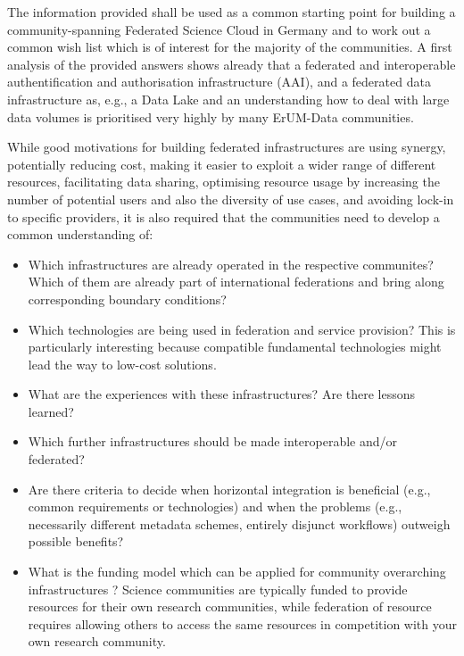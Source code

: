 \documentclass{article}
\begin{document}
The information provided shall be used as a common starting point for building
a community-spanning Federated Science Cloud in Germany and to work out
a common wish list which is of interest for the majority of the communities.
A first analysis of the provided answers shows already that
a federated and interoperable authentification and authorisation infrastructure (AAI),
and a federated data infrastructure as, e.g., a Data Lake and an understanding how to 
deal with large data volumes is prioritised very highly by many ErUM-Data communities.

While good motivations for building federated infrastructures are
using synergy, potentially reducing cost, making it easier to exploit a wider range of
different resources, facilitating data sharing, optimising resource usage
by increasing the number of potential users and also the diversity of use cases,
and avoiding lock-in to specific providers,
it is also required that the communities need to develop a common understanding of:


\begin{itemize}
\item Which infrastructures are already operated in the
respective communites?  Which of them are already part of international
federations and bring along corresponding boundary conditions?

\item Which technologies are being used in federation and service
provision?  This is particularly interesting because compatible
fundamental technologies might lead the way to low-cost solutions.

\item What are the experiences with these infrastructures?  Are there
lessons learned?

\item Which further infrastructures should be made interoperable and/or
federated?

\item Are there criteria to decide when horizontal integration is
beneficial (e.g., common requirements or technologies) and when the
problems (e.g., necessarily different metadata schemes, entirely
disjunct workflows) outweigh possible benefits?

\item What is the funding model which can be applied for community overarching infrastructures ?
Science communities are typically funded to provide resources for their
own research communities, while federation of resource requires allowing
others to access the same resources in competition with your own
research community. 
\end{itemize}
\end{document}
